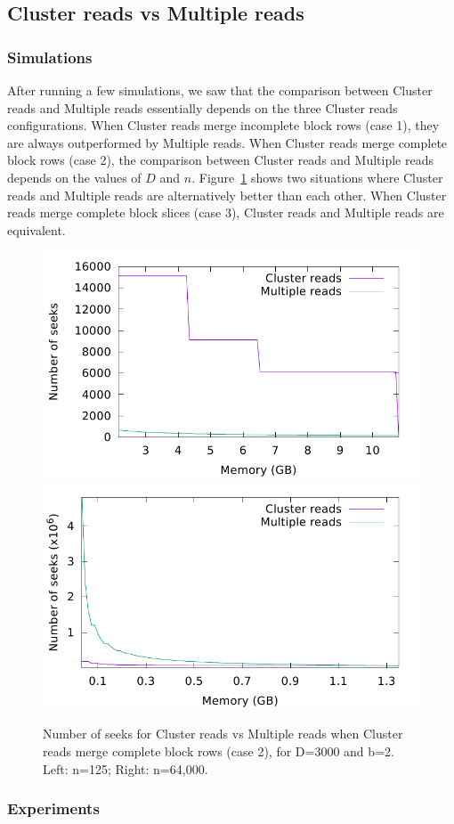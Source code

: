\documentclass[10pt, conference, compsocconf]{IEEEtran}
\begin{document}
\subsection{Cluster reads vs Multiple reads}

\subsubsection{Simulations}
After running a few simulations, we saw that the comparison between
Cluster reads and Multiple reads essentially depends on the three
Cluster reads configurations.  When Cluster reads merge incomplete
block rows (case 1), they are always outperformed by Multiple reads.
When Cluster reads merge complete block rows (case 2), the comparison
between Cluster reads and Multiple reads depends on the values of $D$
and $n$. Figure~\ref{fig:model-comparison} shows two situations where
Cluster reads and Multiple reads are alternatively better than each
other. When Cluster reads merge complete block slices (case 3),
Cluster reads and Multiple reads are equivalent.

\begin{figure}
  \includegraphics[width=0.45\columnwidth]{figures/model-big-brain.pdf}
  \includegraphics[width=0.45\columnwidth]{figures/model-big-brain-rescan.pdf}
  \caption{Number of seeks for Cluster reads vs Multiple reads when
    Cluster reads merge complete block rows (case 2), for D=3000 and
    b=2. Left: n=125; Right: n=64,000.}
  \label{fig:model-comparison}
\end{figure}

\subsubsection{Experiments}
\end{document}
